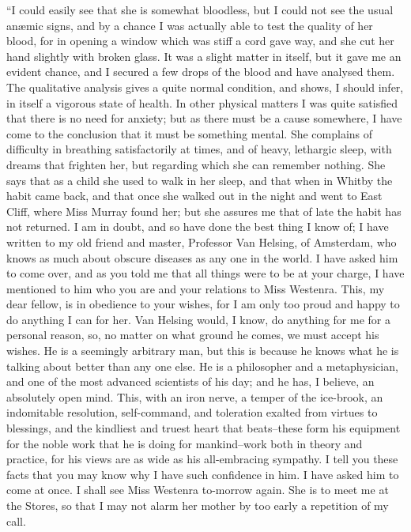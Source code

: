 \documentclass[12pt,openright]{book}
\begin{document}
“I could easily see that she is somewhat bloodless, but I could not see the usual anæmic signs, and by a chance I was actually able to test the quality of her blood, for in opening a window which was stiff a cord gave way, and she cut her hand slightly with broken glass. It was a slight matter in itself, but it gave me an evident chance, and I secured a few drops of the blood and have analysed them. The qualitative analysis gives a quite normal condition, and shows, I should infer, in itself a vigorous state of health. In other physical matters I was quite satisfied that there is no need for anxiety; but as there must be a cause somewhere, I have come to the conclusion that it must be something mental. She complains of difficulty in breathing satisfactorily at times, and of heavy, lethargic sleep, with dreams that frighten her, but regarding which she can remember nothing. She says that as a child she used to walk in her sleep, and that when in Whitby the habit came back, and that once she walked out in the night and went to East Cliff, where Miss Murray found her; but she assures me that of late the habit has not returned. I am in doubt, and so have done the best thing I know of; I have written to my old friend and master, Professor Van Helsing, of Amsterdam, who knows as much about obscure diseases as any one in the world. I have asked him to come over, and as you told me that all things were to be at your charge, I have mentioned to him who you are and your relations to Miss Westenra. This, my dear fellow, is in obedience to your wishes, for I am only too proud and happy to do anything I can for her. Van Helsing would, I know, do anything for me for a personal reason, so, no matter on what ground he comes, we must accept his wishes. He is a seemingly arbitrary man, but this is because he knows what he is talking about better than any one else. He is a philosopher and a metaphysician, and one of the most advanced scientists of his day; and he has, I believe, an absolutely open mind. This, with an iron nerve, a temper of the ice-brook, an indomitable resolution, self-command, and toleration exalted from virtues to blessings, and the kindliest and truest heart that beats–these form his equipment for the noble work that he is doing for mankind–work both in theory and practice, for his views are as wide as his all-embracing sympathy. I tell you these facts that you may know why I have such confidence in him. I have asked him to come at once. I shall see Miss Westenra to-morrow again. She is to meet me at the Stores, so that I may not alarm her mother by too early a repetition of my call.
\end{document}
